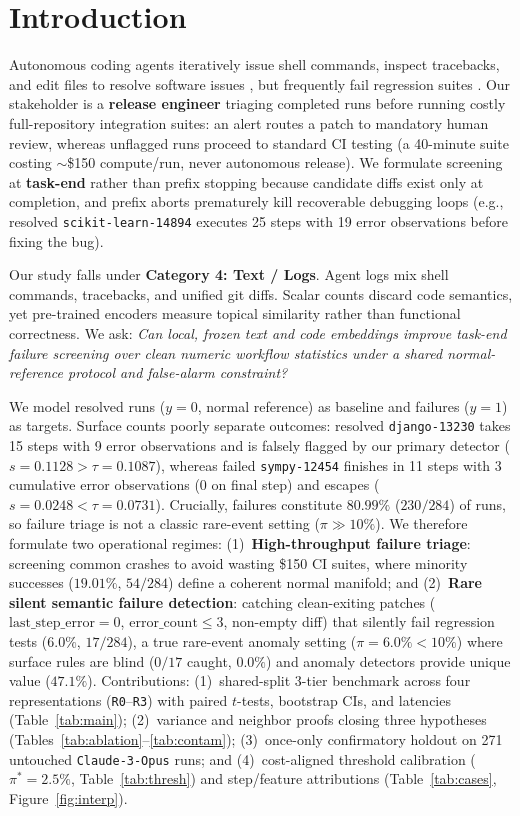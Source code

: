\section{Introduction}
Autonomous coding agents iteratively issue shell commands, inspect tracebacks, and edit files to resolve software issues \citep{yang2024sweagent}, but frequently fail regression suites \citep{jimenez2024swebench}. Our stakeholder is a \textbf{release engineer} triaging completed runs before running costly full-repository integration suites: an alert routes a patch to mandatory human review, whereas unflagged runs proceed to standard CI testing (a 40-minute suite costing $\sim$\$150 compute/run, never autonomous release). We formulate screening at \textbf{task-end} rather than prefix stopping because candidate diffs exist only at completion, and prefix aborts prematurely kill recoverable debugging loops (e.g., resolved \texttt{scikit-learn-14894} executes 25 steps with 19 error observations before fixing the bug).

Our study falls under \textbf{Category 4: Text / Logs}. Agent logs mix shell commands, tracebacks, and unified git diffs. Scalar counts discard code semantics, yet pre-trained encoders measure topical similarity rather than functional correctness. We ask: \emph{Can local, frozen text and code embeddings improve task-end failure screening over clean numeric workflow statistics under a shared normal-reference protocol and false-alarm constraint?}

We model resolved runs ($y=0$, normal reference) as baseline and failures ($y=1$) as targets. Surface counts poorly separate outcomes: resolved \texttt{django-13230} takes 15 steps with 9 error observations and is falsely flagged by our primary detector ($s=0.1128 > \tau=0.1087$), whereas failed \texttt{sympy-12454} finishes in 11 steps with 3 cumulative error observations (0 on final step) and escapes ($s=0.0248 < \tau=0.0731$). Crucially, failures constitute $80.99\%$ ($230/284$) of runs, so failure triage is not a classic rare-event setting ($\pi\gg 10\%$). We therefore formulate two operational regimes: (1)~\textbf{High-throughput failure triage}: screening common crashes to avoid wasting \$150 CI suites, where minority successes ($19.01\%$, $54/284$) define a coherent normal manifold; and (2)~\textbf{Rare silent semantic failure detection}: catching clean-exiting patches ($\mathrm{last\_step\_error}=0$, $\mathrm{error\_count}\le 3$, non-empty diff) that silently fail regression tests ($6.0\%$, $17/284$), a true rare-event anomaly setting ($\pi=6.0\% < 10\%$) where surface rules are blind ($0/17$ caught, $0.0\%$) and anomaly detectors provide unique value ($47.1\%$). Contributions: (1)~shared-split 3-tier benchmark across four representations (\texttt{R0}--\texttt{R3}) with paired $t$-tests, bootstrap CIs, and latencies (Table~\ref{tab:main}); (2)~variance and neighbor proofs closing three hypotheses (Tables~\ref{tab:ablation}--\ref{tab:contam}); (3)~once-only confirmatory holdout on 271 untouched \texttt{Claude-3-Opus} runs; and (4)~cost-aligned threshold calibration ($\pi^*=2.5\%$, Table~\ref{tab:thresh}) and step/feature attributions (Table~\ref{tab:cases}, Figure~\ref{fig:interp}).


